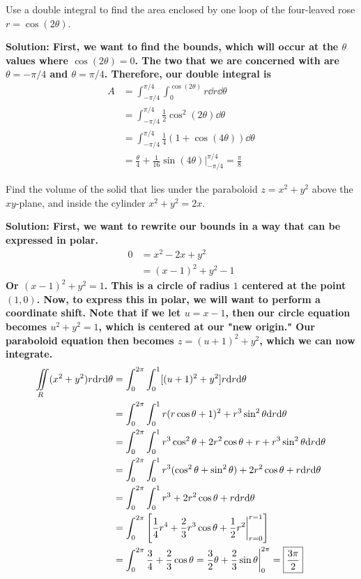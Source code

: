 \begin{example}
    Use a double integral to find the area enclosed by one loop of the four-leaved rose \( r=\cos(2\theta) \). \par\bf{Solution: }First, we want to find the bounds, which will occur at the \( \theta \) values where \( \cos(2\theta) = 0 \). The two that we are concerned with are \( \theta = -\pi/4 \) and \( \theta = \pi/4 \). Therefore, our double integral is
    \begin{align*}
        A &= \int_{-\pi/4}^{\pi/4}\int_0^{\cos(2\theta)}r\dd r\dd \theta \\
        &= \int_{-\pi/4}^{\pi/4} \frac{1}{2}\cos^2(2\theta)\dd \theta \\
        &= \int_{-\pi/4}^{\pi/4} \frac{1}{4}(1+\cos(4\theta))\dd\theta \\
        &= \frac{\theta}{4} + \frac{1}{16}\sin(4\theta)\biggr|_{-\pi/4}^{\pi/4} = \boxed{\frac{\pi}{8}}
    \end{align*}
\end{example}
\begin{example}
    Find the volume of the solid that lies under the paraboloid \( z=x^2+y^2 \) above the \( xy \)-plane, and inside the cylinder \( x^2+y^2=2x \). \par\bf{Solution: }First, we want to rewrite our bounds in a way that can be expressed in polar.
    \begin{align*}
        0 &= x^2-2x+y^2 \\
          &= (x-1)^2 + y^2 - 1
    \end{align*}
    Or \( (x-1)^2+y^2=1 \). This is a circle of radius \( 1 \) centered at the point \( (1, 0) \). Now, to express this in polar, we will want to perform a coordinate shift. Note that if we let \( u = x-1 \), then our circle equation becomes \( u^2+y^2=1 \), which is centered at our "new origin." Our paraboloid equation then becomes \( z=(u+1)^2+y^2 \), which we can now integrate.
    \begin{align*}
        \iint\limits_R (x^2+y^2)r\dd r\dd \theta &= \int_0^{2\pi}\int_0^1[(u+1)^2+y^2]r\dd r\dd \theta \\
        &= \int_0^{2\pi}\int_0^1 r(r\cos\theta + 1)^2 + r^3\sin^2\theta \dd r\dd \theta \\
        &= \int_0^{2\pi}\int_0^1 r^3\cos^2\theta + 2r^2\cos\theta + r + r^3\sin^2\theta \dd r\dd \theta \\
        &= \int_0^{2\pi}\int_0^1 r^3(\cos^2\theta+\sin^2\theta) + 2r^2\cos\theta + r \dd r\dd \theta \\
        &= \int_0^{2\pi}\int_0^1 r^3+2r^2\cos\theta + r\dd r\dd \theta \\
        &= \int_0^{2\pi}\bqty{\frac{1}{4}r^4+\frac{2}{3}r^3\cos\theta+\frac{1}{2}r^2\biggr|_{r=0}^{r=1}} \\
        &= \int_0^{2\pi} \frac{3}{4}+\frac{2}{3}\cos\theta = \frac{3}{2}\theta + \frac{2}{3}\sin\theta\biggr|_0^{2\pi} = \boxed{\frac{3\pi}{2}}
    \end{align*}
\end{example}
